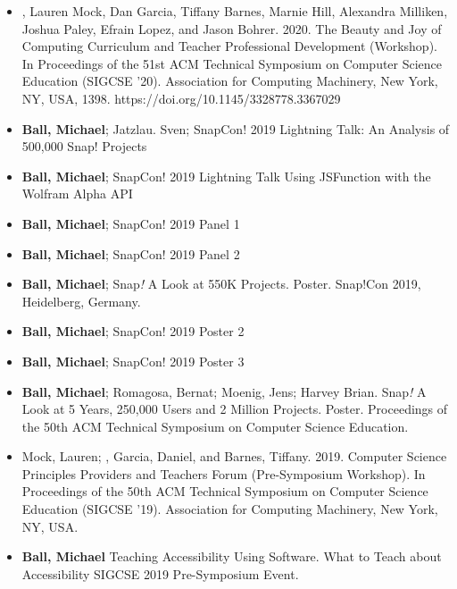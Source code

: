 \begin{itemize}
    \item{\me, Lauren Mock, Dan Garcia, Tiffany Barnes, Marnie Hill, Alexandra Milliken, Joshua Paley, Efrain Lopez, and Jason Bohrer. 2020. The Beauty and Joy of Computing Curriculum and Teacher Professional Development (Workshop). In Proceedings of the 51st ACM Technical Symposium on Computer Science Education (SIGCSE '20). Association for Computing Machinery, New York, NY, USA, 1398. https://doi.org/10.1145/3328778.3367029}

    
    \item{\textbf{Ball, Michael}; Jatzlau. Sven;  SnapCon! 2019 Lightning Talk: An Analysis of 500,000 Snap! Projects}
    
    \item{\textbf{Ball, Michael};  SnapCon! 2019 Lightning Talk Using JSFunction with the Wolfram Alpha API}
    
    \item{\textbf{Ball, Michael}; SnapCon! 2019 Panel 1}
    
    \item{\textbf{Ball, Michael}; SnapCon! 2019 Panel 2}
    
    \item{\textbf{Ball, Michael}; Snap\textit{!} A Look at 550K Projects. Poster. Snap!Con 2019, Heidelberg, Germany.}
    
    \item{\textbf{Ball, Michael}; SnapCon! 2019 Poster 2}
    
    \item{\textbf{Ball, Michael}; SnapCon! 2019 Poster 3}
    
    
    \item{\textbf{Ball, Michael}; Romagosa, Bernat; Moenig, Jens; Harvey Brian. Snap\textit{!} A Look at 5 Years, 250,000 Users and 2 Million Projects. Poster. Proceedings of the 50th ACM Technical Symposium on Computer Science Education.}
    
    \item{Mock, Lauren; \me, Garcia, Daniel, and Barnes, Tiffany. 2019. Computer Science Principles Providers and Teachers Forum (Pre-Symposium Workshop). In Proceedings of the 50th ACM Technical Symposium on Computer Science Education (SIGCSE '19). Association for Computing Machinery, New York, NY, USA.}
    
    \item{\textbf{Ball, Michael} Teaching Accessibility Using Software. What to Teach about Accessibility SIGCSE 2019 Pre-Symposium Event.}
    

\end{itemize}
